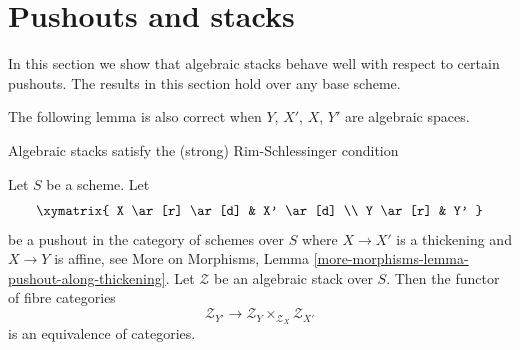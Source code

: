 \section{Pushouts and stacks}
\label{section-pushouts}

\noindent
In this section we show that algebraic stacks behave well with
respect to certain pushouts. The results in this section hold over
any base scheme.

\medskip\noindent
The following lemma is also correct when $Y$, $X'$, $X$, $Y'$ are
algebraic spaces.

\begin{lemma}
\label{lemma-pushout}
\begin{slogan}
Algebraic stacks satisfy the (strong) Rim-Schlessinger condition
\end{slogan}
Let $S$ be a scheme. Let
$$
\xymatrix{
X \ar[r] \ar[d] & X' \ar[d] \\
Y \ar[r] & Y'
}
$$
be a pushout in the category of schemes over $S$ where $X \to X'$
is a thickening and $X \to Y$ is affine, see
More on Morphisms, Lemma \ref{more-morphisms-lemma-pushout-along-thickening}.
Let $\mathcal{Z}$ be an algebraic stack over $S$.
Then the functor of fibre categories
$$
\mathcal{Z}_{Y'}
\longrightarrow
\mathcal{Z}_Y \times_{\mathcal{Z}_X} \mathcal{Z}_{X'}
$$
is an equivalence of categories.
\end{lemma}

